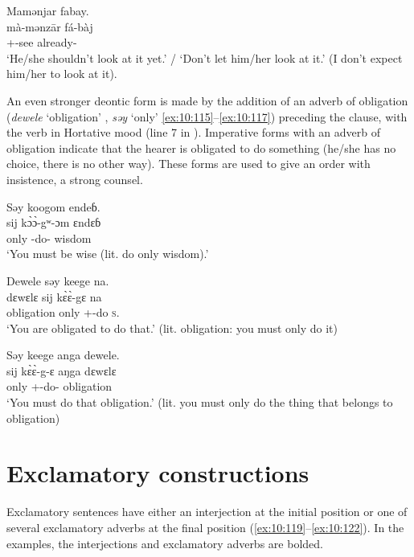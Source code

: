 \ea \label{ex:10:114}
Mamənjar  fabay. \\
\gll  mà-mənz\={a}r     fá-bàj\\
      {\twoS}+{\HOR}-see    already-{\NEG}\\
\glt  ‘He/she shouldn’t look at it yet.’ / ‘Don’t let him/her look at it.’ (I don’t expect him/her to look at it).
\z 

An even stronger deontic form is made by the addition of an adverb of obligation (\textit{dewele} ‘obligation’ , \textit{səy} ‘only’ \ref{ex:10:115}–\ref{ex:10:117}) preceding the clause, with the verb in Hortative mood (line 7 in ). Imperative forms with an adverb of obligation indicate that the hearer is obligated to do something (he/she has no choice, there is no other way). These forms are used to give an order with insistence, a strong counsel.

\ea \label{ex:10:115}
Səy  koogom  endeɓ.\\
\gll  sij     k\`{ɔ}\`{ɔ}-gʷ-ɔm   ɛndɛɓ\\
      only    {\twoP}-do-{\twoP}   wisdom\\
\glt  ‘You must be wise (lit. do only wisdom).’
\z 

\ea \label{ex:10:116}
Dewele  səy  keege  na.\\
\gll  dɛwɛlɛ   sij   k\`{ɛ}\`{ɛ}-gɛ     na\\
      obligation  only   {\twoS}+{\HOR}-do   \textsc{s}.{\DO}\\
\glt  ‘You are obligated to do that.’ (lit. obligation: you must only do it)
\z 

\ea \label{ex:10:117}
Səy  keege  anga  dewele.\\
\gll  sij     k\`{ɛ}\`{ɛ}-g-ɛ     aŋga   dɛwɛlɛ\\
      only   {\twoS}+{\HOR}-do-{\CL}   {\POSS}   obligation\\
\glt  ‘You must do that obligation.’ (lit. you must only do the thing that belongs to obligation)
\z 

\section{Exclamatory constructions}\label{sec:10.5}
\hypertarget{RefHeading1213121525720847}{}
Exclamatory sentences have either an interjection at the initial position  or one of several exclamatory adverbs at the final position (\ref{ex:10:119}–\ref{ex:10:122}). In the examples, the interjections and exclamatory adverbs are bolded. 

